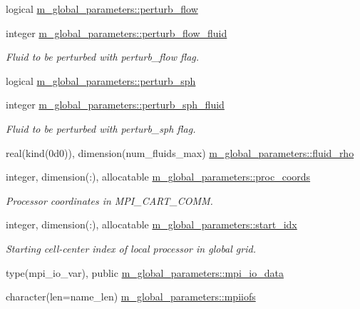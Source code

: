 \begin{DoxyCompactItemize}
logical \hyperlink{namespacem__global__parameters_add2d4033abdced8536200ef739ab379b}{m\+\_\+global\+\_\+parameters\+::perturb\+\_\+flow}
\item 
integer \hyperlink{namespacem__global__parameters_a1c242fb70db5a2c91c0997b37bcffd6a}{m\+\_\+global\+\_\+parameters\+::perturb\+\_\+flow\+\_\+fluid}
\begin{DoxyCompactList}\small\item\em Fluid to be perturbed with perturb\+\_\+flow flag. \end{DoxyCompactList}\item 
logical \hyperlink{namespacem__global__parameters_a98ddabe1c45996064589ca24ce5d8fe3}{m\+\_\+global\+\_\+parameters\+::perturb\+\_\+sph}
\item 
integer \hyperlink{namespacem__global__parameters_a90f36c0b74894ddd901534dd4efccfc8}{m\+\_\+global\+\_\+parameters\+::perturb\+\_\+sph\+\_\+fluid}
\begin{DoxyCompactList}\small\item\em Fluid to be perturbed with perturb\+\_\+sph flag. \end{DoxyCompactList}\item 
real(kind(0d0)), dimension(num\+\_\+fluids\+\_\+max) \hyperlink{namespacem__global__parameters_a3bde8cf1ea00471fcd005219c55e824e}{m\+\_\+global\+\_\+parameters\+::fluid\+\_\+rho}
\item 
integer, dimension(\+:), allocatable \hyperlink{namespacem__global__parameters_a48dea2bc17c5e4465a444c926070ae9b}{m\+\_\+global\+\_\+parameters\+::proc\+\_\+coords}
\begin{DoxyCompactList}\small\item\em Processor coordinates in M\+P\+I\+\_\+\+C\+A\+R\+T\+\_\+\+C\+O\+MM. \end{DoxyCompactList}\item 
integer, dimension(\+:), allocatable \hyperlink{namespacem__global__parameters_a4bd117ae744eab60f3d681fd03d6e90d}{m\+\_\+global\+\_\+parameters\+::start\+\_\+idx}
\begin{DoxyCompactList}\small\item\em Starting cell-\/center index of local processor in global grid. \end{DoxyCompactList}\item 
type(mpi\+\_\+io\+\_\+var), public \hyperlink{namespacem__global__parameters_ad80f68aac31aa898ab2d7729f60e375f}{m\+\_\+global\+\_\+parameters\+::mpi\+\_\+io\+\_\+data}
\item 
character(len=name\+\_\+len) \hyperlink{namespacem__global__parameters_ad4713c1e89eaa8fac3bb2181ba87b192}{m\+\_\+global\+\_\+parameters\+::mpiiofs}

\end{DoxyCompactItemize}
